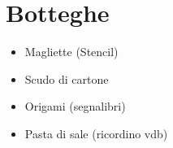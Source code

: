 \documentclass[../main.tex]{subfiles}
\begin{document}
    \section{Botteghe}
    \begin{itemize}
        \item Magliette (Stencil)
        \item Scudo di cartone
        \item Origami (segnalibri)
        \item Pasta di sale (ricordino vdb)
    \end{itemize}
\end{document}
